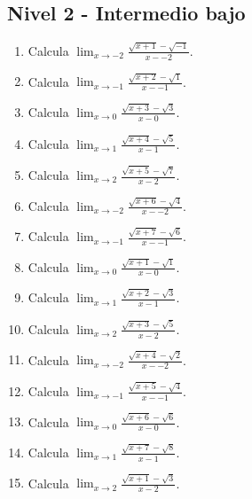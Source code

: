 \documentclass[11pt,a4paper]{article}
\begin{document}
\subsection{Nivel 2 - Intermedio bajo}

\begin{enumerate}[label=\textbf{E\arabic*.},start=521]

\item Calcula $\displaystyle\lim_{x\to -2}\frac{\sqrt{x+1}-\sqrt{-1}}{x--2}$.

\item Calcula $\displaystyle\lim_{x\to -1}\frac{\sqrt{x+2}-\sqrt{1}}{x--1}$.

\item Calcula $\displaystyle\lim_{x\to 0}\frac{\sqrt{x+3}-\sqrt{3}}{x-0}$.

\item Calcula $\displaystyle\lim_{x\to 1}\frac{\sqrt{x+4}-\sqrt{5}}{x-1}$.

\item Calcula $\displaystyle\lim_{x\to 2}\frac{\sqrt{x+5}-\sqrt{7}}{x-2}$.

\item Calcula $\displaystyle\lim_{x\to -2}\frac{\sqrt{x+6}-\sqrt{4}}{x--2}$.

\item Calcula $\displaystyle\lim_{x\to -1}\frac{\sqrt{x+7}-\sqrt{6}}{x--1}$.

\item Calcula $\displaystyle\lim_{x\to 0}\frac{\sqrt{x+1}-\sqrt{1}}{x-0}$.

\item Calcula $\displaystyle\lim_{x\to 1}\frac{\sqrt{x+2}-\sqrt{3}}{x-1}$.

\item Calcula $\displaystyle\lim_{x\to 2}\frac{\sqrt{x+3}-\sqrt{5}}{x-2}$.

\item Calcula $\displaystyle\lim_{x\to -2}\frac{\sqrt{x+4}-\sqrt{2}}{x--2}$.

\item Calcula $\displaystyle\lim_{x\to -1}\frac{\sqrt{x+5}-\sqrt{4}}{x--1}$.

\item Calcula $\displaystyle\lim_{x\to 0}\frac{\sqrt{x+6}-\sqrt{6}}{x-0}$.

\item Calcula $\displaystyle\lim_{x\to 1}\frac{\sqrt{x+7}-\sqrt{8}}{x-1}$.

\item Calcula $\displaystyle\lim_{x\to 2}\frac{\sqrt{x+1}-\sqrt{3}}{x-2}$.


\end{enumerate}
\end{document}
